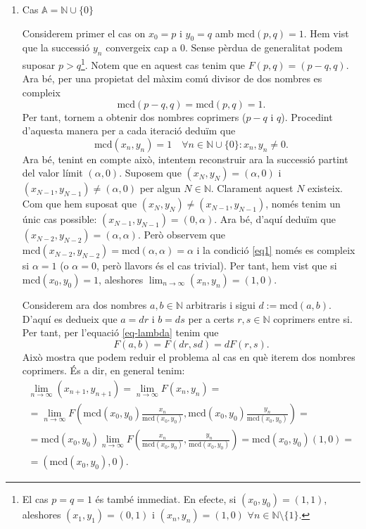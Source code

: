 \documentclass[11pt,a4paper]{article}
\theoremstyle{definition}
\newcommand{\NN}{\ensuremath{\mathbb{N}}}
\renewcommand{\gcd}{\text{mcd}}
\begin{document}
\begin{enumerate}
    \item Cas $\mathbb{A}=\NN\cup\{0\}$\par
          Considerem primer el cas on $x_0=p$ i $y_0=q$ amb $\gcd(p,q)=1$. Hem vist que la successió $y_n$ convergeix cap a 0. Sense pèrdua de generalitat podem suposar $p>q$\footnote{El cas $p=q=1$ és també immediat. En efecte, si $(x_0,y_0)=(1,1)$, aleshores $(x_1,y_1)=(0,1)$ i $(x_n,y_n)=(1,0)$ $\forall n\in\mathbb{N}\setminus\{1\}$.}. Notem que en aquest cas tenim que $F(p,q)=(p-q,q)$. Ara bé, per una propietat del màxim comú divisor de dos nombres es compleix $$\gcd(p-q,q)=\gcd(p,q)=1.$$ Per tant, tornem a obtenir dos nombres coprimers ($p-q$ i $q$). Procedint d'aquesta manera per a cada iteració deduïm que
          \begin{equation}
              \gcd(x_n,y_n)=1\quad\forall n\in\NN\cup\{0\}: x_n,y_n\ne0.
              \label{eq1}
          \end{equation} Ara bé, tenint en compte això, intentem reconstruir ara la successió partint del valor límit $(\alpha,0)$. Suposem que $(x_N,y_N)=(\alpha,0)$ i $(x_{N-1},y_{N-1})\ne(\alpha,0)$ per algun $N\in\NN$. Clarament aquest $N$ existeix. Com que hem suposat que $(x_N,y_N)\ne(x_{N-1},y_{N-1})$, només tenim un únic cas possible: $(x_{N-1},y_{N-1})=(0,\alpha)$. Ara bé, d'aquí deduïm que $(x_{N-2},y_{N-2})=(\alpha,\alpha)$. Però observem que $\gcd(x_{N-2},y_{N-2})=\gcd(\alpha,\alpha)=\alpha$ i la condició \eqref{eq1} només es compleix si $\alpha=1$ (o $\alpha=0$, però llavors és el cas trivial). Per tant, hem vist que si $\gcd(x_0,y_0)=1$, aleshores $\displaystyle\lim_{n\to\infty}(x_n,y_n)=(1,0)$.\par Considerem ara dos nombres $a,b\in\NN$ arbitraris i sigui $d:=\gcd(a,b)$. D'aquí es dedueix que $a=dr$ i $b=ds$ per a certs $r,s\in\NN$ coprimers entre si. Per tant, per l'equació \eqref{eq-lambda} tenim que $$F(a,b)=F(dr,sd)=dF(r,s).$$ Això mostra que podem reduir el problema al cas en què iterem dos nombres coprimers. És a dir, en general tenim:
          \begin{multline*}
              \lim_{n\to\infty}(x_{n+1},y_{n+1})=\lim_{n\to\infty}F(x_n,y_n)=\\=\lim_{n\to\infty}F\left(\gcd(x_0,y_0)\frac{x_n}{\gcd(x_0,y_0)},\gcd(x_0,y_0)\frac{y_n}{\gcd(x_0,y_0)}\right)=\\=\gcd(x_0,y_0)\lim_{n\to\infty}F\left(\frac{x_n}{\gcd(x_0,y_0)},\frac{y_n}{\gcd(x_0,y_0)}\right)=\gcd(x_0,y_0)(1,0)=\\=(\gcd(x_0,y_0),0).

\end{multline*}
\end{enumerate}
\end{document}
